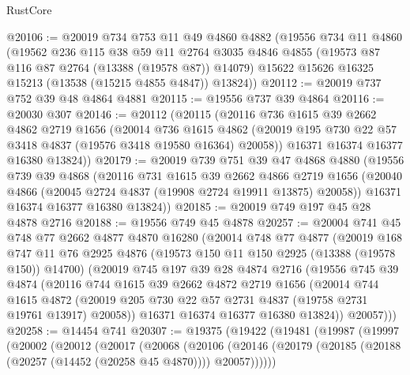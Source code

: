 \begin{lexlean}{RustCore}
\begin{coremodule}
@20106 := @20019
    @734
    @753
    @11
    @49
    @4860
    @4882
    (@19556
      @734
      @11
      @4860
      (@19562
        @236
        @115
        @38
        @59
        @11
        @2764
        @3035
        @4846
        @4855
        (@19573 @87 @116 @87 @2764 (@13388 (@19578 @87)) @14079)
        @15622
        @15626
        @16325
        @15213
        (@13538 (@15215 @4855 @4847))
        @13824))
@20112 := @20019 @737 @752 @39 @48 @4864 @4881
@20115 := @19556 @737 @39 @4864
@20116 := @20030 @307
@20146 := @20112
    (@20115
      (@20116
        @736
        @1615
        @39
        @2662
        @4862
        @2719
        @1656
        (@20014
          @736
          @1615
          @4862
          (@20019 @195 @730 @22 @57 @3418 @4837 (@19576 @3418 @19580 @16364) @20058))
        @16371
        @16374
        @16377
        @16380
        @13824))
@20179 := @20019
    @739
    @751
    @39
    @47
    @4868
    @4880
    (@19556
      @739
      @39
      @4868
      (@20116
        @731
        @1615
        @39
        @2662
        @4866
        @2719
        @1656
        (@20040 @4866 (@20045 @2724 @4837 (@19908 @2724 @19911 @13875) @20058))
        @16371
        @16374
        @16377
        @16380
        @13824))
@20185 := @20019 @749 @197 @45 @28 @4878 @2716
@20188 := @19556 @749 @45 @4878
@20257 := @20004
    @741
    @45
    @748
    @77
    @2662
    @4877
    @4870
    @16280
    (@20014
      @748
      @77
      @4877
      (@20019
        @168
        @747
        @11
        @76
        @2925
        @4876
        (@19573 @150 @11 @150 @2925 (@13388 (@19578 @150)) @14700)
        (@20019
          @745
          @197
          @39
          @28
          @4874
          @2716
          (@19556
            @745
            @39
            @4874
            (@20116
              @744
              @1615
              @39
              @2662
              @4872
              @2719
              @1656
              (@20014
                @744
                @1615
                @4872
                (@20019 @205 @730 @22 @57 @2731 @4837 (@19758 @2731 @19761 @13917) @20058))
              @16371
              @16374
              @16377
              @16380
              @13824))
          @20057)))
@20258 := @14454 @741
@20307 := @19375
    (@19422
      (@19481
        (@19987
          (@19997
            (@20002
              (@20012
                (@20017
                  (@20068
                    (@20106
                      (@20146
                        (@20179 (@20185 (@20188 (@20257 (@14452 (@20258 @45 @4870)))) @20057))))))

\end{coremodule}
\end{lexlean}

